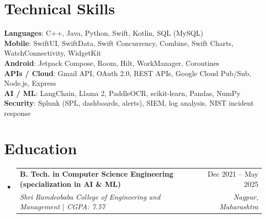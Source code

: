 \documentclass[a4paper,11pt]{article}
\makeatletter
\newcommand{\resumeSubheading}[4]{
  \vspace{-1pt}\item
    \begin{tabularx}{0.97\textwidth}[t]{@{}>{\raggedright\arraybackslash}X@{\hspace{0.75em}}r@{}}
      \textbf{#1} & #2 \\
      \textit{\small#3} & \textit{\small #4} \\
    \end{tabularx}\vspace{-3pt}
}
\newcommand{\resumeSubItemListStart}{\begin{itemize}[leftmargin=0.15in, label={}]}
\newcommand{\resumeSubItemListEnd}{\end{itemize}}
\makeatother
\begin{document}
\section{Technical Skills}
  \begin{itemize}[leftmargin=0.15in, label={}]
    \small{\item{
      \textbf{Languages}{: C++, Java, Python, Swift, Kotlin, SQL (MySQL)} \\
      \textbf{Mobile}{: SwiftUI, SwiftData, Swift Concurrency, Combine, Swift Charts, WatchConnectivity, WidgetKit} \\
      \textbf{Android}{: Jetpack Compose, Room, Hilt, WorkManager, Coroutines} \\
      \textbf{APIs / Cloud}{: Gmail API, OAuth 2.0, REST APIs, Google Cloud Pub/Sub, Node.js, Express} \\
      \textbf{AI / ML}{: LangChain, Llama 2, PaddleOCR, scikit-learn, Pandas, NumPy} \\
      \textbf{Security}{: Splunk (SPL, dashboards, alerts), SIEM, log analysis, NIST incident response}
    }}
  \end{itemize}

\section{Education}
  \resumeSubItemListStart
    \resumeSubheading
      {B. Tech. in Computer Science Engineering (specialization in AI \& ML)}{Dec 2021 -- May 2025}
      {Shri Ramdeobaba College of Engineering and Management $|$ CGPA: 7.57}{Nagpur, Maharashtra}
  \resumeSubItemListEnd
\end{document}
